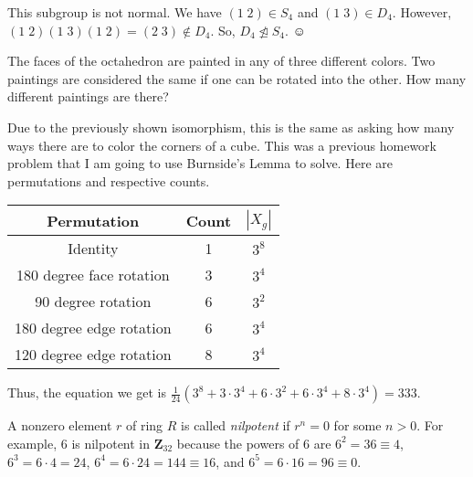 \documentclass[12pt]{exam}
\newcommand{\announce}[1]
{\vspace\baselineskip{\parindent0in {\bf #1}}}
\begin{document}
\begin{questions}
\announce{Solution 3:} This subgroup is not normal. We have $(1 \; 2) \in S_4$ and $(1 \; 3) \in D_4$. However, $(1 \; 2)(1 \; 3)(1 \; 2) = (2 \; 3) \not\in D_4$. So, $D_4 \not \trianglelefteq S_4$. $\smiley$

\vspace{2cm}

\question The faces of the octahedron are painted in any of three different colors.  Two paintings are considered the same if one can be rotated into the other.  How many different paintings are there?

\announce{Solution 4:} Due to the previously shown isomorphism, this is the same as asking how many ways there are to color the corners of a cube. This was a previous homework problem that I am going to use Burnside's Lemma to solve. Here are permutations and respective counts. 



\begin{center}
	\begin{tabular}{ c | c | c }
		\textbf{Permutation} & \textbf{Count} & $|X_g|$ \\
		\hline
		Identity & 1 & $3^8$\\
		180 degree face rotation & 3 &$3^4$ \\
		90 degree rotation & 6 &$3^2$ \\
		180 degree edge rotation & 6 &$3^4$ \\
		120 degree edge rotation & 8 &$3^4$ \\
	\end{tabular}
\end{center}

Thus, the equation we get is $\frac{1}{24}(3^8 +3\cdot 3^4 + 6 \cdot 3^2 + 6\cdot 3^4 + 8\cdot 3^4) = \boxed{333}$. 

\vfill

\clearpage

\question A nonzero element $r$ of ring $R$ is called \emph{nilpotent} if $r^n = 0$ for some $n > 0$.  For example, 6 is nilpotent in $\mathbf Z_{32}$ because the powers of 6 are $6^2 = 36 \equiv 4$, $6^3 = 6\cdot4 = 24$, $6^4 = 6\cdot24 = 144 \equiv 16$, and $6^5 = 6\cdot16 = 96 \equiv 0$.

\end{questions}
\end{document}
